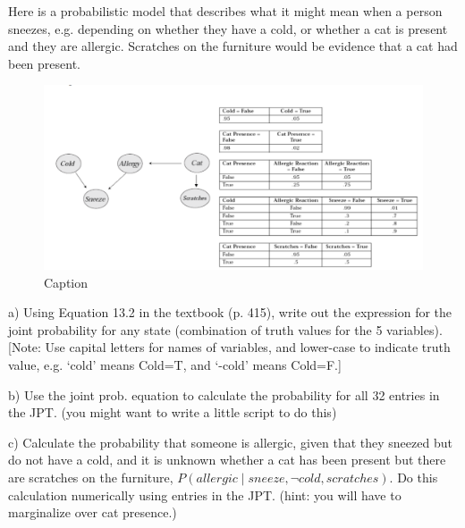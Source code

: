 \documentclass{article}
\theoremstyle{definition}
\newcommand{\<}{\langle}
\renewcommand{\>}{\rangle}
\begin{document}
\begin{enumerate}[label=\textbf{\Alph*}]
  \vspace{1.5em}
  Here is a probabilistic model that describes what it might mean when a person sneezes, e.g. depending on whether they have a cold, or whether a cat is present and they are allergic. Scratches on the furniture would be evidence that a cat had been present.

    \begin{figure}[h!]
        \centering
        \includegraphics{fig1.PNG}
        \caption{Caption}
        \label{fig:my_label}
    \end{figure}

    a) Using Equation 13.2 in the textbook (p. 415), write out the expression for the joint probability for any state (combination of truth values for the 5 variables). [Note: Use capital letters for names of variables, and lower-case to indicate truth value, e.g. ‘cold’ means Cold=T, and ‘-cold’ means Cold=F.]

    b) Use the joint prob. equation to calculate the probability for all 32 entries in the JPT. (you might want to write a little script to do this)

    c) Calculate the probability that someone is allergic, given that they sneezed but do not have a cold, and it is unknown whether a cat has been present but there are scratches on the furniture, $P(allergic \mid sneeze,\neg cold,scratches)$. Do this calculation numerically using entries in the JPT. (hint: you will have to marginalize over cat presence.)



\end{enumerate}
\end{document}
